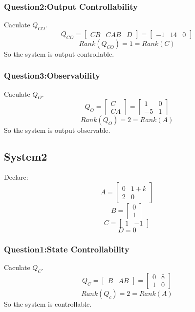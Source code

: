 \documentclass[12pt,a4paper,oneside]{ctexart}
\begin{document}
            \subsubsection{Question2:Output Controllability}
                Caculate $Q_{CO}$.
                $$Q_{CO} = \begin{bmatrix}
                    CB&CAB&D
                \end{bmatrix} = \begin{bmatrix}
                    -1&14&0
                \end{bmatrix}$$
                $$Rank(Q_{CO})=1=Rank(C)$$
                So the system is output controllable.
                
            \subsubsection{Question3:Observability}
                Caculate $Q_{O}$.
                $$Q_{O} = \begin{bmatrix}
                    C\\
                    CA
                \end{bmatrix} = \begin{bmatrix}
                    1&0\\
                    -5&1
                \end{bmatrix}$$
                $$Rank(Q_{O})=2=Rank(A)$$
                So the system is output observable.

        \subsection{System2}
        Declare:
            $$
            A=\begin{bmatrix}
                0&1+k\\
                2&0
            \end{bmatrix}
            $$
            $$
            B=\begin{bmatrix}
                0\\
                1
            \end{bmatrix}
            $$
            $$
            C=\begin{bmatrix}
                1&-1
            \end{bmatrix}
            $$
            $$
            D=0
            $$
            \subsubsection{Question1:State Controllability}
                Caculate $Q_C$.
                $$Q_C = \begin{bmatrix}
                    B&AB
                \end{bmatrix} = \begin{bmatrix}
                    0&8\\
                    1&0
                \end{bmatrix}$$
                $$Rank(Q_c)=2=Rank(A)$$
                So the system is controllable.
\end{document}
